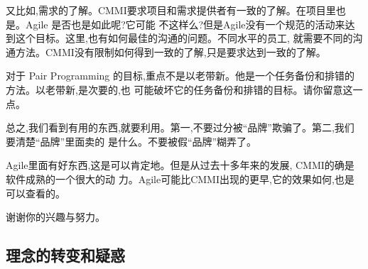 \documentclass[11pt]{article}
\begin{document}
\begin{yang}
又比如,需求的了解。CMMI要求项目和需求提供者有一致的了解。在项目里也是。Agile 是否也是如此呢?它可能
不这样么?但是Agile没有一个规范的活动来达到这个目标。这里,也有如何最佳的沟通的问题。不同水平的员工,
就需要不同的沟通方法。CMMI没有限制如何得到一致的了解,只是要求达到一致的了解。

对于 Pair Programming 的目标,重点不是以老带新。他是一个任务备份和排错的方法。以老带新,是次要的,也
可能破坏它的任务备份和排错的目标。请你留意这一点。

总之,我们看到有用的东西,就要利用。第一,不要过分被``品牌''欺骗了。第二,我们要清楚``品牌''里面卖的
是什么。不要被假``品牌''糊弄了。

Agile里面有好东西,这是可以肯定地。但是从过去十多年来的发展, CMMI的确是软件成熟的一个很大的动
力。Agile可能比CMMI出现的更早,它的效果如何,也是可以查看的。

谢谢你的兴趣与努力。
\end{yang}

\subsection{理念的转变和疑惑}
\end{document}
